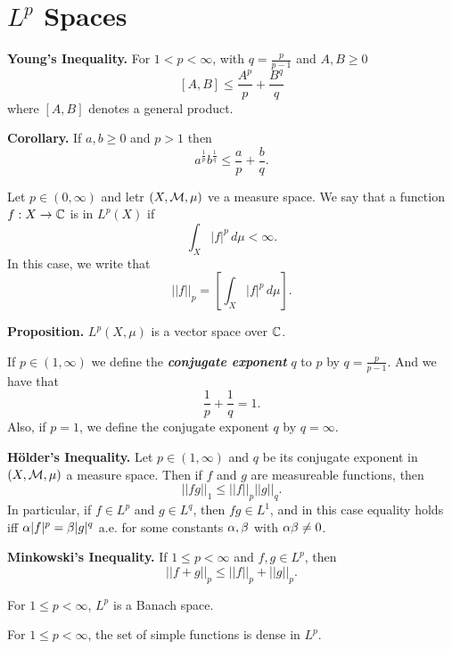 \newpage
\section{$L^p$ Spaces}

\vs

\textbf{Young's Inequality.} For $1 < p < \infty$, with $q = \frac{p}{p - 1}$ and $A,B \geq 0$
\[[A,B] \leq \frac{A^p}{p} + \frac{B^q}{q}\]
where $[A,B]$ denotes a general product.

\vs

\textbf{Corollary.} If $a,b\geq 0$ and $p>1$ then
\[a^\frac{1}{p}b^\frac{1}{q} \leq \frac{a}{p} + \frac{b}{q}.\]

\vs

\dfn Let $p\in (0,\infty)$ and letr $(X, \mathcal{M}, \mu)$ ve a measure space. We say that a function $f:X\rightarrow \mathbb{C}$ is in $L^p(X)$ if
\[\int_X|f|^p\, d\mu < \infty.\]
In this case, we write that
\[||f||_p = \left[\int_X |f|^p\,d\mu\right].\]

\vs

\textbf{Proposition.} $L^p(X, \mu)$ is a vector space over $\mathbb{C}$.

\vs

\dfn If $p\in (1,\infty)$ we define the \textbf{\textit{conjugate exponent}} $q$ to $p$ by $q = \frac{p}{p-1}$. And we have that
\[\frac{1}{p} + \frac{1}{q} = 1.\]
Also, if $p = 1$, we define the conjugate exponent $q$ by $q = \infty$.

\vs

\textbf{H\"older's Inequality.} Let $p\in (1,\infty)$ and $q$ be its conjugate exponent in $(X, \mathcal{M}, \mu)$ a measure space. Then if $f$ and $g$ are measureable functions, then
\[||fg||_1 \leq ||f||_p||g||_q.\]
In particular, if $f\in L^p$ and $g\in L^q$, then $fg\in L^1$, and in this case equality holds iff $\alpha|f|^p = \beta|g|^q$ a.e. for some constants $\alpha,\beta$ with $\alpha\beta \neq 0$.

\vs

\textbf{Minkowski's Inequality.} If $1\leq p < \infty$ and $f,g\in L^p$, then
\[||f + g||_p \leq ||f||_p + ||g||_p.\]

\vs

\setcounter{thm}{5}
\begin{thm}
For $1\leq p < \infty$, $L^p$ is a Banach space.
\end{thm}

\vs

\begin{prop}
For $1\leq p < \infty$, the set of simple functions is dense in $L^p$.
\end{prop}

